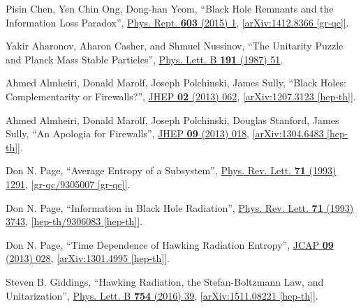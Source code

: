 \documentclass[12pt,preprintnumbers, floatfix, preprintnumbers, letterpaper, superscriptaddress,nofootinbib]{revtex4-2}
\begin{document}
\begin{thebibliography}{99}
\raggedright

Pisin Chen, Yen Chin Ong, Dong-han Yeom, ``Black Hole Remnants and the Information Loss Paradox'', {\href{https://www.sciencedirect.com/science/article/abs/pii/S0370157315004391?via\%3Dihub}{Phys. Rept. \textbf{603} (2015) 1}}, \href{https://arxiv.org/abs/1412.8366}{[arXiv:1412.8366 [gr-qc]]}.

 Yakir Aharonov, Aharon Casher, and Shmuel Nussinov, ``The Unitarity Puzzle and Planck Mass Stable Particles'', {\href{https://www.sciencedirect.com/science/article/abs/pii/0370269387913207?via\%3Dihub}{Phys. Lett. B \textbf{191} (1987) 51}}.

 Ahmed Almheiri, Donald Marolf, Joseph Polchinski, James Sully, ``Black Holes: Complementarity or Firewalls?'', {\href{https://doi.org/10.1007/JHEP02(2013)062}{JHEP \textbf{02} (2013) 062}}, \href{https://arxiv.org/abs/1207.3123}{[arXiv:1207.3123 [hep-th]]}.

Ahmed Almheiri, Donald Marolf, Joseph Polchinski, Douglas Stanford, James Sully, ``An Apologia for Firewalls'',  {\href{https://link.springer.com/article/10.1007/JHEP09(2013)018}{JHEP \textbf{09} (2013) 018}}, \href{https://arxiv.org/abs/1304.6483}{[arXiv:1304.6483 [hep-th]]}.

Don N. Page, ``Average Entropy of a Subsystem'', {\href{https://doi.org/10.1103/PhysRevLett.71.1291}{Phys. Rev. Lett. \textbf{71} (1993) 1291}}, \href{https://arxiv.org/abs/gr-qc/9305007}{[gr-qc/9305007 [gr-qc]]}.

Don N. Page, ``Information in Black Hole Radiation'',  {\href{https://doi.org/10.1103/PhysRevLett.71.3743}{Phys. Rev. Lett. \textbf{71} (1993) 3743}}, \href{https://arxiv.org/abs/hep-th/9306083}{[hep-th/9306083 [hep-th]]}.

Don N. Page, ``Time Dependence of Hawking Radiation Entropy'', {\href{https://iopscience.iop.org/article/10.1088/1475-7516/2013/09/028}{JCAP \textbf{09} (2013) 028}}, \href{https://arxiv.org/abs/1301.4995}{[arXiv:1301.4995 [hep-th]]}.

Steven B. Giddings, ``Hawking Radiation, the Stefan-Boltzmann Law, and Unitarization'', {\href{https://www.sciencedirect.com/science/article/pii/S0370269316000022?via\%3Dihub}{Phys. Lett. B \textbf{754} (2016) 39}}, \href{https://arxiv.org/abs/1511.08221}{[arXiv:1511.08221 [hep-th]]}.


\end{thebibliography}
\end{document}
